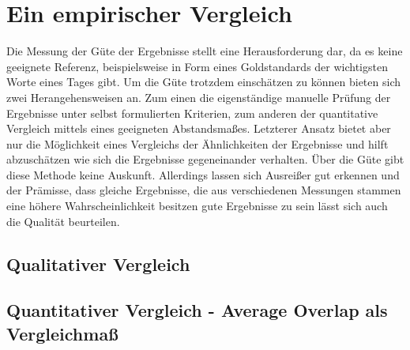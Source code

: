  








\chapter{Ein empirischer Vergleich}

Die Messung der Güte der Ergebnisse stellt eine Herausforderung dar, da es keine geeignete Referenz, beispielsweise in Form eines Goldstandards der wichtigsten Worte eines Tages gibt. Um die Güte trotzdem einschätzen zu können bieten sich zwei Herangehensweisen an. Zum einen die eigenständige manuelle Prüfung der Ergebnisse unter selbst formulierten Kriterien, zum anderen der quantitative Vergleich mittels eines geeigneten Abstandsmaßes. Letzterer Ansatz bietet aber nur die Möglichkeit eines Vergleichs der Ähnlichkeiten der Ergebnisse und hilft abzuschätzen wie sich die Ergebnisse gegeneinander verhalten. Über die Güte gibt diese Methode keine Auskunft. Allerdings lassen sich Ausreißer gut erkennen und der Prämisse, dass gleiche Ergebnisse, die aus verschiedenen Messungen stammen eine höhere Wahrscheinlichkeit besitzen gute Ergebnisse zu sein lässt sich auch die Qualität beurteilen.
\section{Qualitativer Vergleich}



\section{Quantitativer Vergleich - Average Overlap als Vergleichma\ss}






